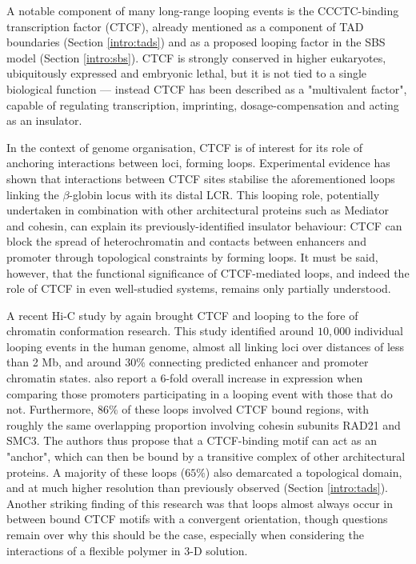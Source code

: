 \documentclass[a4paper,11pt,oneside]{book}
\begin{document}
A notable component of many long-range looping events is the CCCTC-binding transcription factor (CTCF),\cite{Ong2014, Phillips2009, Handoko2011} already mentioned as a component of TAD boundaries (Section \ref{intro:tads}) and as a proposed looping factor in the SBS model (Section \ref{intro:sbs}). CTCF is strongly conserved in higher eukaryotes,\cite{Filippova1996a} ubiquitously expressed and embryonic lethal, but it is not tied to a single biological function --- instead CTCF has been described as a "multivalent factor",\cite{Phillips2009} capable of regulating transcription, imprinting, dosage-compensation and acting as an insulator. 

In the context of genome organisation, CTCF is of interest for its role of anchoring interactions between loci, forming loops. Experimental evidence has shown that interactions between CTCF sites stabilise the aforementioned loops linking the $\beta$-globin locus with its distal LCR.\cite{Splinter2006} This looping role, potentially undertaken in combination with other architectural proteins such as Mediator and cohesin,\cite{Phillips-Cremins2013, Sexton2009} can explain its previously-identified insulator behaviour: CTCF can block the spread of heterochromatin and contacts between enhancers and promoter through topological constraints by forming loops.\cite{Phillips2009} It must be said, however, that the functional significance of CTCF-mediated loops, and indeed the role of CTCF in even well-studied systems, remains only partially understood.\cite{Gomez-Diaz2014}

A recent Hi-C study by \citet{Rao2014} again brought CTCF and looping to the fore of chromatin conformation research. This study identified around $10,000$ individual looping events in the human genome, almost all linking loci over distances of less than 2 Mb, and around $30\%$ connecting predicted enhancer and promoter chromatin states. \citet{Rao2014} also report a 6-fold overall increase in expression when comparing those promoters participating in a looping event with those that do not. Furthermore, $86\%$ of these loops involved CTCF bound regions, with roughly the same overlapping proportion involving cohesin subunits RAD21 and SMC3. The authors thus propose that a CTCF-binding motif can act as an "anchor", which can then be bound by a transitive complex of other architectural proteins.\cite{Rao2014} A majority of these loops ($65\%$) also demarcated a topological domain, and at much higher resolution than previously observed (Section \ref{intro:tads}). Another striking finding of this research was that loops almost always occur in between bound CTCF motifs with a convergent orientation,\cite{Rao2014} though questions remain over why this should be the case, especially when considering the interactions of a flexible polymer in 3-D solution.\cite{Nichols2015}
\end{document}
